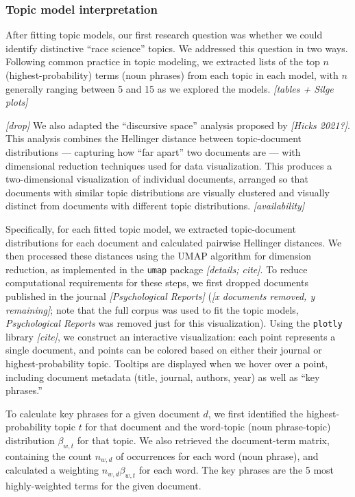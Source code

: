 \documentclass[12pt]{article}
\begin{document}
\hypertarget{topic-model-interpretation}{%
\subsubsection*{Topic model interpretation}\label{topic-model-interpretation}}

After fitting topic models, our first research question was whether we could identify distinctive ``race science'' topics. We addressed this question in two ways. Following common practice in topic modeling, we extracted lists of the top \(n\) (highest-probability) terms (noun phrases) from each topic in each model, with \(n\) generally ranging between 5 and 15 as we explored the models. \emph{{[}tables + Silge plots{]}}

\emph{{[}drop{]}}
We also adapted the ``discursive space'' analysis proposed by \emph{{[}Hicks 2021?{]}}. This analysis combines the Hellinger distance between topic-document distributions --- capturing how ``far apart'' two documents are --- with dimensional reduction techniques used for data visualization. This produces a two-dimensional visualization of individual documents, arranged so that documents with similar topic distributions are visually clustered and visually distinct from documents with different topic distributions. \emph{{[}availability{]}}

Specifically, for each fitted topic model, we extracted topic-document distributions for each document and calculated pairwise Hellinger distances. We then processed these distances using the UMAP algorithm for dimension reduction, as implemented in the \texttt{umap} package \emph{{[}details; cite{]}}. To reduce computational requirements for these steps, we first dropped documents published in the journal \emph{{[}Psychological Reports{]}} (\emph{{[}x documents removed, y remaining{]}}; note that the full corpus was used to fit the topic models, \emph{Psychological Reports} was removed just for this visualization). Using the \texttt{plotly} library \emph{{[}cite{]}}, we construct an interactive visualization: each point represents a single document, and points can be colored based on either their journal or highest-probability topic. Tooltips are displayed when we hover over a point, including document metadata (title, journal, authors, year) as well as ``key phrases.''

To calculate key phrases for a given document \(d\), we first identified the highest-probability topic \(t\) for that document and the word-topic (noun phrase-topic) distribution \(\beta_{w,t}\) for that topic. We also retrieved the document-term matrix, containing the count \(n_{w,d}\) of occurrences for each word (noun phrase), and calculated a weighting \(n_{w,d} \beta_{w,t}\) for each word. The key phrases are the 5 most highly-weighted terms for the given document.
\end{document}
